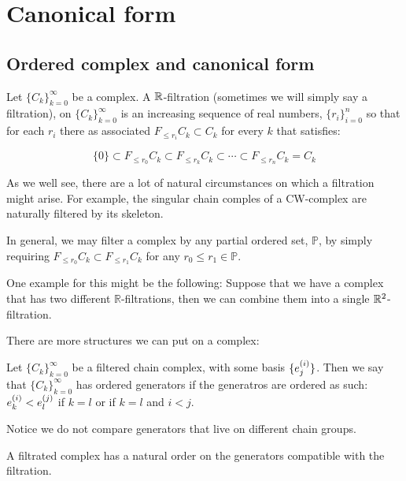
\chapter{Canonical form}

%

\section{Ordered complex and canonical form}


\begin{definition}
Let $\{C_k\}_{k=0}^{\infty}$ be a complex. 
A $\mathbb{R}$-filtration (sometimes we will simply say a filtration), on $\{C_k\}_{k=0}^{\infty}$ 
is an increasing sequence of real numbers, $\{r_i\}_{i=0}^n$
so that for each $r_i$ there as associated $F_{\leq r_i}C_k\subset C_k$ for every $k$
that satisfies:

$$
\{0\}\subset
F_{\leq r_0}C_k
\subset
F_{\leq r_k}C_k
\subset
\cdots
\subset
F_{\leq r_n}C_k
=
C_k
$$
\end{definition}

As we well see, there are a lot of natural circumstances on which a filtration might arise. For example, 
the singular chain comples of a CW-complex are naturally filtered by its skeleton.


In general, we may filter a complex by any partial ordered set, $\mathbb{P}$,
by simply requiring $F_{\leq r_0}C_k\subset F_{\leq r_1}C_k$
for any $r_0\leq r_1\in\mathbb{P}$. 

One example for this might be the following: Suppose that we have a complex
that has two different $\mathbb{R}$-filtrations, then we can combine them into a single 
$\mathbb{R}^2$-filtration.


There are more structures we can put on a complex:


\begin{definition}

Let $\{C_k\}_{k=0}^{\infty}$ be a filtered chain complex, with some basis $\{e_{j}^{(i)}\}$.
Then we say that $\{C_k\}_{k=0}^{\infty}$ has ordered generators if the 
generatros are ordered as such:
$e_{k}^{(i)}<e_{l}^{(j)}$ if  $k=l$ or if $k=l$ and $i<j$.

Notice we do not compare generators that live on different chain groups.
\end{definition}

\begin{remark}
A filtrated complex has a natural order on the generators compatible with the filtration.
\end{remark}


